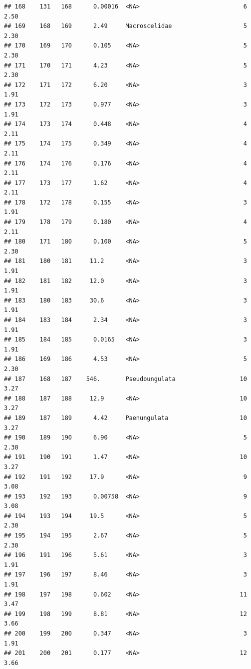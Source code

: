 \documentclass[10pt,letterpaper]{article}
\begin{document}
\begin{verbatim}
## 168    131   168      0.00016  <NA>                             6    2.50 
## 169    168   169      2.49     Macroscelidae                    5    2.30 
## 170    169   170      0.105    <NA>                             5    2.30 
## 171    170   171      4.23     <NA>                             5    2.30 
## 172    171   172      6.20     <NA>                             3    1.91 
## 173    172   173      0.977    <NA>                             3    1.91 
## 174    173   174      0.448    <NA>                             4    2.11 
## 175    174   175      0.349    <NA>                             4    2.11 
## 176    174   176      0.176    <NA>                             4    2.11 
## 177    173   177      1.62     <NA>                             4    2.11 
## 178    172   178      0.155    <NA>                             3    1.91 
## 179    178   179      0.180    <NA>                             4    2.11 
## 180    171   180      0.100    <NA>                             5    2.30 
## 181    180   181     11.2      <NA>                             3    1.91 
## 182    181   182     12.0      <NA>                             3    1.91 
## 183    180   183     30.6      <NA>                             3    1.91 
## 184    183   184      2.34     <NA>                             3    1.91 
## 185    184   185      0.0165   <NA>                             3    1.91 
## 186    169   186      4.53     <NA>                             5    2.30 
## 187    168   187    546.       Pseudoungulata                  10    3.27 
## 188    187   188     12.9      <NA>                            10    3.27 
## 189    187   189      4.42     Paenungulata                    10    3.27 
## 190    189   190      6.90     <NA>                             5    2.30 
## 191    190   191      1.47     <NA>                            10    3.27 
## 192    191   192     17.9      <NA>                             9    3.08 
## 193    192   193      0.00758  <NA>                             9    3.08 
## 194    193   194     19.5      <NA>                             5    2.30 
## 195    194   195      2.67     <NA>                             5    2.30 
## 196    191   196      5.61     <NA>                             3    1.91 
## 197    196   197      8.46     <NA>                             3    1.91 
## 198    197   198      0.602    <NA>                            11    3.47 
## 199    198   199      8.81     <NA>                            12    3.66 
## 200    199   200      0.347    <NA>                             3    1.91 
## 201    200   201      0.177    <NA>                            12    3.66 

\end{verbatim}
\end{document}
